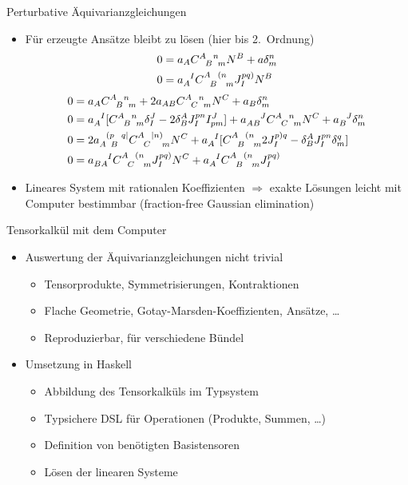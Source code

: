 \documentclass{beamer}
\newcommand{\gmc}[4]{\ensuremath{C^{#1\hphantom{#2}#3}_{\hphantom{#1}{#2}\hphantom{#3}#4}}}
\begin{document}
    \begin{frame}{Perturbative Äquivarianzgleichungen}
        \begin{itemize}
            \item Für erzeugte Ansätze bleibt zu lösen (hier bis 2.\ Ordnung)
            \begin{align*}
                0 &{} = a_A \gmc{A}{B}{n}{m} N^B + a \delta^n_m \\
                0 &{} = a_A^{\hphantom AI}\gmc{A}{B}{(n}{m} J^{pq)}_I N^B
            \end{align*}
            \begin{align*}
                0 &{} = a_A \gmc{A}{B}{n}{m} + 2 a_{AB} \gmc{A}{C}{n}{m} N^C + a_B \delta^n_m \\
                0 &{} = a_A^{\hphantom AI}\lbrack \gmc{A}{B}{n}{m} \delta^J_I - 2\delta^A_B J^{pn}_I I^J_{pm}\rbrack + a_{AB}^{\hphantom{AB}J}\gmc{A}{C}{n}{m} N^C + a_B^{\hphantom BJ} \delta^n_m \\
                0 &{} = 2a_{A \hphantom pB}^{\hphantom A(p\hphantom Bq\mid} \gmc{A}{C}{\mid n)}{m} N^C + a_A^{\hphantom AI}\lbrack \gmc{A}{B}{(n}{m} 2J^{p)q}_I - \delta^A_B J^{pn}_I \delta^q_m\rbrack \\
                0 &{} = a_{BA}^{\hphantom{BA}I} \gmc{A}{C}{(n}{m} J^{pq)}_I N^C + a_A^{\hphantom AI}\gmc{A}{B}{(n}{m} J^{pq)}_I
            \end{align*}
            \item Lineares System mit rationalen Koeffizienten $\Rightarrow$ exakte Lösungen leicht mit
            Computer bestimmbar (fraction-free Gaussian elimination)
        \end{itemize}
    \end{frame}

    \begin{frame}{Tensorkalkül mit dem Computer}
        \begin{itemize}
            \item Auswertung der Äquivarianzgleichungen nicht trivial
            \begin{itemize}
                \item Tensorprodukte, Symmetrisierungen, Kontraktionen
                \item Flache Geometrie, Gotay-Marsden-Koeffizienten, Ansätze, \ldots
                \item Reproduzierbar, für verschiedene Bündel
            \end{itemize}
            \item Umsetzung in Haskell
            \begin{itemize}
                \item Abbildung des Tensorkalküls im Typsystem
                \item Typsichere DSL für Operationen (Produkte, Summen, \ldots)
                \item Definition von benötigten Basistensoren
                \item Lösen der linearen Systeme
            \end{itemize}
        \end{itemize}
    \end{frame}
\end{document}
